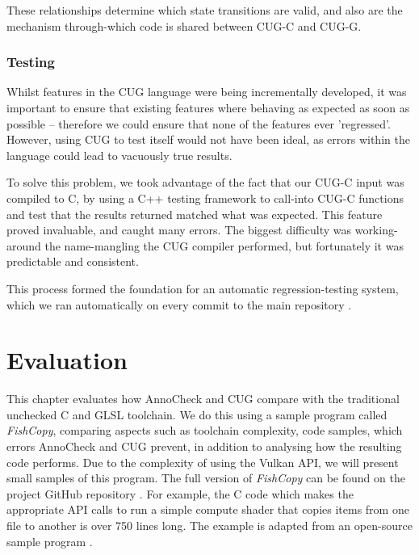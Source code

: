 \documentclass[a4paper,12pt,twoside,openright]{report}
\begin{document}
These relationships determine which state transitions are valid, and also are
the mechanism through-which code is shared between CUG-C and CUG-G.

\subsection{Testing}

Whilst features in the CUG language were being incrementally developed, it was
important to ensure that existing features where behaving as expected as soon
as possible -- therefore we could ensure that none of the features ever
'regressed'. However, using CUG to test itself would not have been ideal, as
errors within the language could lead to vacuously true results.

To solve this problem, we took advantage of the fact that our CUG-C input was
compiled to C, by using a C++ testing framework to call-into CUG-C functions
and test that the results returned matched what was expected. This feature
proved invaluable, and caught many errors. The biggest difficulty was
working-around the name-mangling the CUG compiler performed, but fortunately it
was predictable and consistent.

This process formed the foundation for an automatic regression-testing system,
which we ran automatically on every commit to the main repository
\cite{ProjectSource}.




\chapter{Evaluation}


This chapter evaluates how AnnoCheck and CUG compare with the traditional
unchecked C and GLSL toolchain. We do this using a sample program called
\textit{FishCopy}, comparing aspects such as toolchain complexity, code
samples, which errors AnnoCheck and CUG prevent, in addition to analysing how
the resulting code performs. Due to the complexity of using the Vulkan API, we
will present small samples of this program. The full version of
\textit{FishCopy} can be found on the project GitHub repository
\cite{ProjectSource}. For example, the C code which makes the appropriate API
calls to run a simple compute shader that copies items from one file to another
is over 750 lines long. The example is adapted from an open-source sample
program \cite{VulkanComputeExampleSource}.
\end{document}
